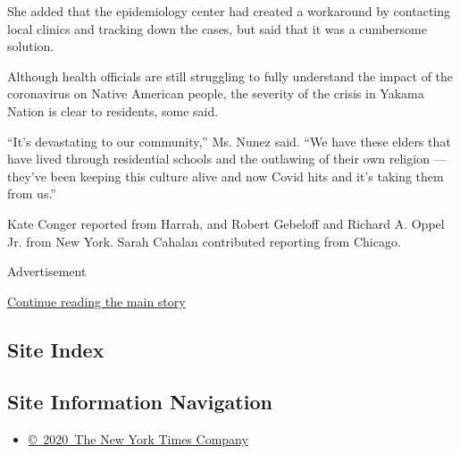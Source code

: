 She added that the epidemiology center had created a workaround by
contacting local clinics and tracking down the cases, but said that it
was a cumbersome solution.

Although health officials are still struggling to fully understand the
impact of the coronavirus on Native American people, the severity of the
crisis in Yakama Nation is clear to residents, some said.

``It's devastating to our community,'' Ms. Nunez said. ``We have these
elders that have lived through residential schools and the outlawing of
their own religion --- they've been keeping this culture alive and now
Covid hits and it's taking them from us.''

Kate Conger reported from Harrah, and Robert Gebeloff and Richard A.
Oppel Jr. from New York. Sarah Cahalan contributed reporting from
Chicago.

Advertisement

\protect\hyperlink{after-bottom}{Continue reading the main story}

\hypertarget{site-index}{%
\subsection{Site Index}\label{site-index}}

\hypertarget{site-information-navigation}{%
\subsection{Site Information
Navigation}\label{site-information-navigation}}

\begin{itemize}
\tightlist
\item
  \href{https://help.nytimes.com/hc/en-us/articles/115014792127-Copyright-notice}{©~2020~The
  New York Times Company}
\end{itemize}


